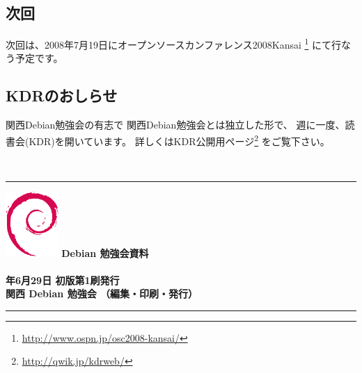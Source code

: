 \documentclass[mingoth,a4paper]{jsarticle}
\newcommand{\debmtgyear}{2008}
\newcommand{\debmtgdate}{29}
\newcommand{\debmtgmonth}{6}
\begin{document}

\subsection{次回}
次回は、2008年7月19日にオープンソースカンファレンス2008Kansai
\footnote{\url{http://www.ospn.jp/osc2008-kansai/}}
にて行なう予定です。

\subsection{KDRのおしらせ}
関西Debian勉強会の有志で
関西Debian勉強会とは独立した形で、
週に一度、読書会(KDR)を開いています。
詳しくはKDR公開用ページ\footnote{\url{http://qwik.jp/kdrweb/}}
をご覧下さい。

　
\printindex
 \cleartooddpage

 \begin{minipage}[b]{0.2\hsize}
 \end{minipage}
 \begin{minipage}[b]{0.8\hsize}

 \vspace*{15cm}
 \rule{\hsize}{1mm}
 \vspace{2mm}
 \includegraphics[width=2cm]{image200502/openlogo-nd.eps}
 \noindent \Large \bf Debian 勉強会資料\\ \\
 \noindent \normalfont \debmtgyear{}年\debmtgmonth{}月\debmtgdate{}日 \hspace{5mm}  初版第1刷発行\\
 \noindent \normalfont 関西 Debian 勉強会 （編集・印刷・発行）\\
 \rule{\hsize}{1mm}
 \end{minipage}
\end{document}
